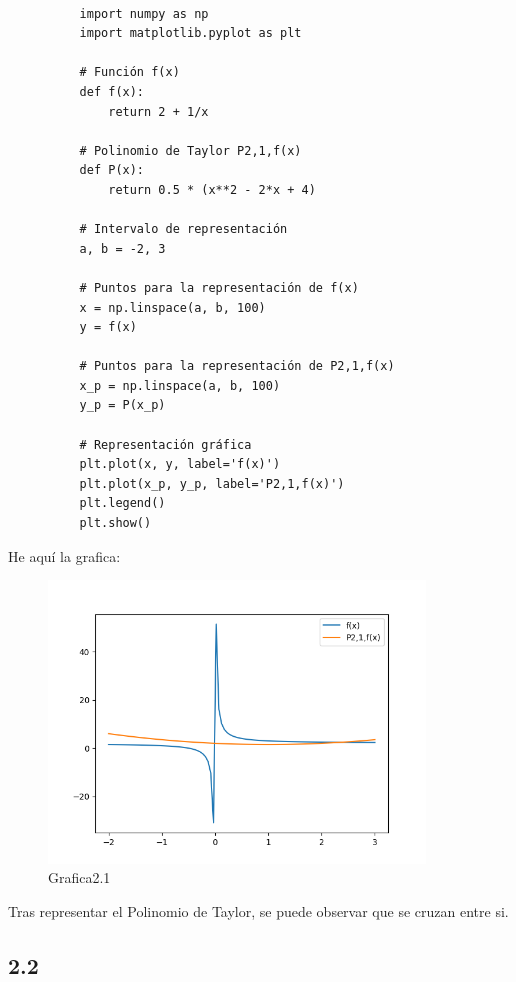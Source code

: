 \documentclass[12pt]{article}
\begin{document}
        \begin{lstlisting}

          import numpy as np
          import matplotlib.pyplot as plt

          # Función f(x)
          def f(x):
              return 2 + 1/x

          # Polinomio de Taylor P2,1,f(x)
          def P(x):
              return 0.5 * (x**2 - 2*x + 4)

          # Intervalo de representación
          a, b = -2, 3

          # Puntos para la representación de f(x)
          x = np.linspace(a, b, 100)
          y = f(x)

          # Puntos para la representación de P2,1,f(x)
          x_p = np.linspace(a, b, 100)
          y_p = P(x_p)

          # Representación gráfica
          plt.plot(x, y, label='f(x)')
          plt.plot(x_p, y_p, label='P2,1,f(x)')
          plt.legend()
          plt.show()

        \end{lstlisting}

        He aquí la grafica:

        \begin{figure}
          \centering %
          \includegraphics[width=10cm]{Grafica2.1.png} %
          \caption[short]{Grafica2.1} %
        \end{figure}

        Tras representar el Polinomio de Taylor, se puede observar que se cruzan entre si.

      \subsection{2.2}
\end{document}
